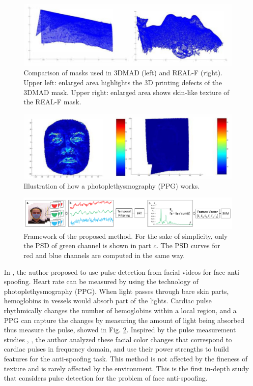 \documentclass[journal]{IEEEtran}
\begin{document}
\begin{figure}[!t]
	\centering
	\includegraphics[width=0.7\linewidth]{img/F_1}
	\caption{Comparison of masks used in 3DMAD (left) and REAL-F (right). Upper left: enlarged area highlights the 3D printing defects of the 3DMAD mask. Upper right: enlarged area shows skin-like texture of the REAL-F mask.}
	\label{fig_F_1}
\end{figure}

\begin{figure}[!t]
	\centering
	\includegraphics[width=1\linewidth]{img/F_2}
	\caption{Illustration of how a photoplethysmography (PPG) works.}
	\label{fig_F_2}
\end{figure}

\begin{figure}[!t]
	\centering
	\includegraphics[width=1\linewidth]{img/F_3}
	\caption{Framework of the proposed method. For the sake of simplicity, only the PSD of green channel is shown in part $c$. The PSD curves for red and blue channels are computed in the same way.}
	\label{fig_F_3}
\end{figure}


In \cite{li2016generalized}, the author proposed to use pulse detection from facial videos for face anti-spoofing. Heart rate can be measured by using the technology of photoplethysmography (PPG).  When light passes through bare skin parts, hemoglobins in vessels would absorb part of the lights. Cardiac pulse rhythmically changes the number of hemoglobins within a local region, and a PPG can capture the changes by measuring the amount of light being absorbed thus measure the pulse,  showed in Fig. \ref{fig_F_2}. Inspired by the pulse measurement studies \cite{li2014remote}, \cite{poh2011advancements}, the author analyzed these facial color changes that correspond to cardiac pulses in frequency domain, and use their power strengths to build features for the anti-spoofing task. This method is not affected by the fineness of texture and is rarely affected by the environment.  This is the first in-depth study that considers pulse detection for the problem of face anti-spoofing. 
\end{document}

